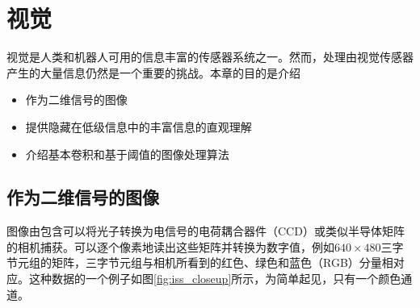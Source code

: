 \chapter{视觉}
\label{chap:vision}


视觉是人类和机器人可用的信息丰富的传感器系统之一。然而，处理由视觉传感器产生的大量信息仍然是一个重要的挑战。本章的目的是介绍

\begin{itemize}

\item 作为二维信号的图像
\item 提供隐藏在低级信息中的丰富信息的直观理解
\item 介绍基本卷积和基于阈值的图像处理算法
\end{itemize}

\section{作为二维信号的图像}


图像由包含可以将光子转换为电信号的电荷耦合器件（CCD）或类似半导体矩阵的相机捕获。可以逐个像素地读出这些矩阵并转换为数字值，例如$640\times 480$三字节元组的矩阵，三字节元组与相机所看到的红色、绿色和蓝色（RGB）分量相对应。这种数据的一个例子如图\ref{fig:iss_closeup}所示，为简单起见，只有一个颜色通道。

